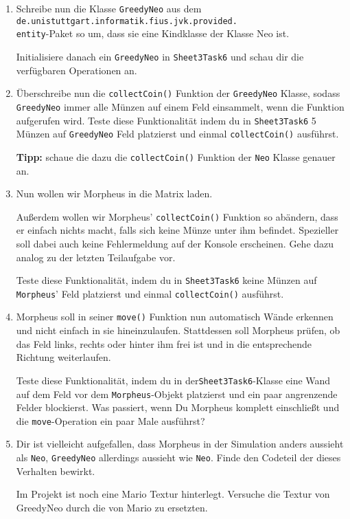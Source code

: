 \begin{enumerate}\setcounter{enumi}{0}
\item Schreibe nun die Klasse \lstinline{GreedyNeo} aus dem \texttt{de.unistuttgart.informatik.fius.jvk.provided.}\\\texttt{entity}-Paket so um, dass sie eine Kindklasse der Klasse Neo ist.

Initialisiere danach ein \lstinline{GreedyNeo} in \lstinline{Sheet3Task6} und schau dir die verfügbaren Operationen an.

\item Überschreibe nun die \lstinline{collectCoin()} Funktion der \lstinline{GreedyNeo} Klasse, sodass \lstinline{GreedyNeo} immer alle Münzen auf einem Feld einsammelt, wenn die Funktion aufgerufen wird.
Teste diese Funktionalität indem du in \lstinline{Sheet3Task6} 5 Münzen auf \lstinline{GreedyNeo} Feld platzierst und einmal \lstinline{collectCoin()} ausführst.

\textbf{Tipp:} schaue die dazu die \lstinline{collectCoin()} Funktion der \lstinline{Neo} Klasse genauer an.

\item Nun wollen wir Morpheus in die Matrix laden.

Außerdem wollen wir Morpheus' \lstinline{collectCoin()} Funktion so abändern, dass er einfach nichts macht, falls sich keine Münze unter ihm befindet.
Spezieller soll dabei auch keine Fehlermeldung auf der Konsole erscheinen.
Gehe dazu analog zu der letzten Teilaufgabe vor.

Teste diese Funktionalität, indem du in \lstinline{Sheet3Task6} keine Münzen auf \lstinline{Morpheus}' Feld platzierst und einmal \lstinline{collectCoin()} ausführst.

\item Morpheus soll in seiner \lstinline{move()} Funktion nun automatisch Wände erkennen und nicht einfach in sie hineinzulaufen.
Stattdessen soll Morpheus prüfen, ob das Feld links, rechts oder hinter ihm frei ist und in die entsprechende Richtung weiterlaufen.

Teste diese Funktionalität, indem du in der\lstinline{Sheet3Task6}-Klasse eine Wand auf dem Feld vor dem \lstinline{Morpheus}-Objekt platzierst und ein paar angrenzende Felder blockierst.
Was passiert, wenn Du Morpheus komplett einschließt und die \lstinline{move}-Operation ein paar Male ausführst?

\item \optional Dir ist vielleicht aufgefallen, dass Morpheus in der Simulation anders aussieht als \lstinline{Neo}, \lstinline{GreedyNeo} allerdings aussieht wie \lstinline{Neo}.
Finde den Codeteil der dieses Verhalten bewirkt.

Im Projekt ist noch eine Mario Textur hinterlegt.
Versuche die Textur von GreedyNeo durch die von Mario zu ersetzten.

\end{enumerate}
